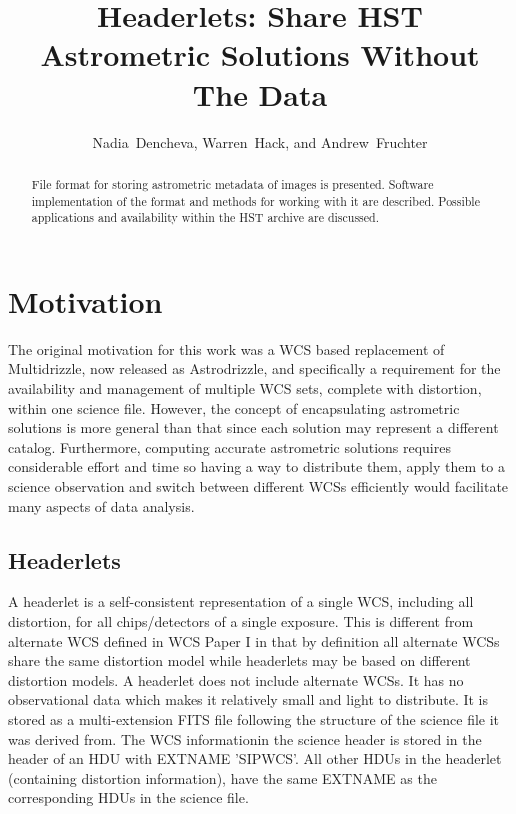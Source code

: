
\resetcounters




\title{Headerlets: Share HST Astrometric Solutions Without The Data}
\author{Nadia~Dencheva, Warren~Hack, and Andrew~Fruchter
}


\begin{abstract}
File format for storing astrometric metadata of images is presented. 
Software implementation of the format and methods for working with 
it are described. Possible applications and availability within 
the HST archive are discussed.
\end{abstract}

\section{Motivation}
The original motivation for this work was a WCS based replacement
of Multidrizzle, now released as Astrodrizzle, and specifically a
requirement for the availability and management of multiple WCS
sets, complete with distortion,
within one science file. However, the concept of encapsulating
astrometric solutions is more general than that since each solution
may represent a different catalog. Furthermore, computing accurate
astrometric solutions requires considerable effort and time so having
a way to distribute them, apply them to a science observation and
switch between different WCSs efficiently would facilitate many
aspects of data analysis.

\subsection{Headerlets}
A headerlet is a self-consistent representation of a single WCS,
including all distortion, for all chips/detectors of a single
exposure. This is different from alternate WCS defined in WCS
Paper I \citep{greisen_2002} in that by definition
all alternate WCSs share the same distortion model while headerlets
may be based on different distortion models. A headerlet does not 
include alternate WCSs. It has no observational data
which makes it relatively small and light to distribute. 
It is stored as a multi-extension FITS file
following the structure of the science file it was derived from.
The WCS informationin the science header is stored in the header of 
an HDU with EXTNAME 'SIPWCS'. All other HDUs in the headerlet 
(containing distortion information), have the same EXTNAME as the 
corresponding HDUs in the science file.

